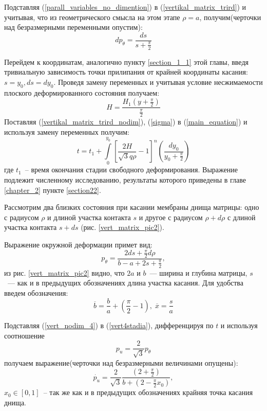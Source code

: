 Подставляя (\ref{parall_variables_no_dimention}) в (\ref{vertikal_matrix_trird}) и учитывая, что из геометрического смысла на этом этапе $\rho = a$, получим(черточки над безразмерными переменными опустим):
	\begin{equation}
	dp_\theta = \dfrac{ds}{s+\frac{\pi}{2}}
	\label{vertikal_matrix_trird_nodim}
	\end{equation}

Перейдем к координатам, аналогично пункту \ref{section_1_1} этой главы, введя тривиальную зависимость точки прилипания от крайней координаты касания: $s=y_0, ds = dy_0$.
Проведя замену переменных и учитывая условие несжимаемости плоского деформированного состояния получаем:
	\begin{equation}
	H=\dfrac{H_1(y+\frac{\pi}{2})}{\frac{\pi}{2}}
	\end{equation}
Поставляя (\ref{vertikal_matrix_trird_nodim}), (\ref{sigma}) в (\ref{main_equation}) и используя замену переменных получим:
\begin{equation}
t = t_1 + \int\limits_0^{y_0}\left[ \dfrac{2H}{\sqrt3 q \rho} -1\right]^n\left(\dfrac{dy_0}{y_0+\frac{\pi}{2}}\right)
\end{equation}
	где $t_1$~-- время окончания стадии свободного деформирования.   
Выражение подлежит численному исследованию, результаты которого приведены в главе \ref{chapter_2} пункте \ref{section22}.

	

	
	Рассмотрим два близких состояния при касании мембраны днища матрицы:
	одно  с радиусом $\rho$ и длиной участка контакта $s$ и другое с радиусом $\rho+d\rho$ с длиной участка контакта $s+ds$ (рис. \ref{vert_matrix_pic2}).
	
	Выражение окружной деформации примет вид:
	\begin{equation}
	p_\theta = \dfrac{2ds+\frac{\pi}{2}d\rho}{b-a+2s+\frac{\pi}{2}},
	\label{vert4stadia}
	\end{equation}
   из рис. \ref{vert_matrix_pic2} видно, что $2a$ и $b$~--- ширина и глубина матрицы, $s$~--- как и в предыдущих обозначениях длина участка касания. Для удобства введем обозначения:
   \begin{equation}
   \overline{b} = \dfrac{b}{a}+\left(\dfrac \pi 2 -1\right),\; \overline{x} = \dfrac{s}{a}
	\label{vert_nodim_4}
   \end{equation}
	   
	
    Подставляя (\ref{vert_nodim_4}) в (\ref{vert4stadia}), дифференцируя по $t$ 
    и используя соотношение 
    \begin{equation} 
    p_u=\frac{2}{\sqrt 3}p_\theta
	\end{equation}
     получаем выражение(черточки над безразмерными величинами опущены):
    \begin{equation}
    \dot{p_u} = \dfrac{2}{\sqrt 3}\dfrac{\left( 2+\frac{\pi}{2}\right)}{b+\left(2-\frac{\pi}{2}x_0\right)},
    \label{vert_nodim}
    \end{equation}
	$x_0 \in [0, 1]$~-- так же как и в предыдущих обозначениях крайняя точка касания днища.
	
